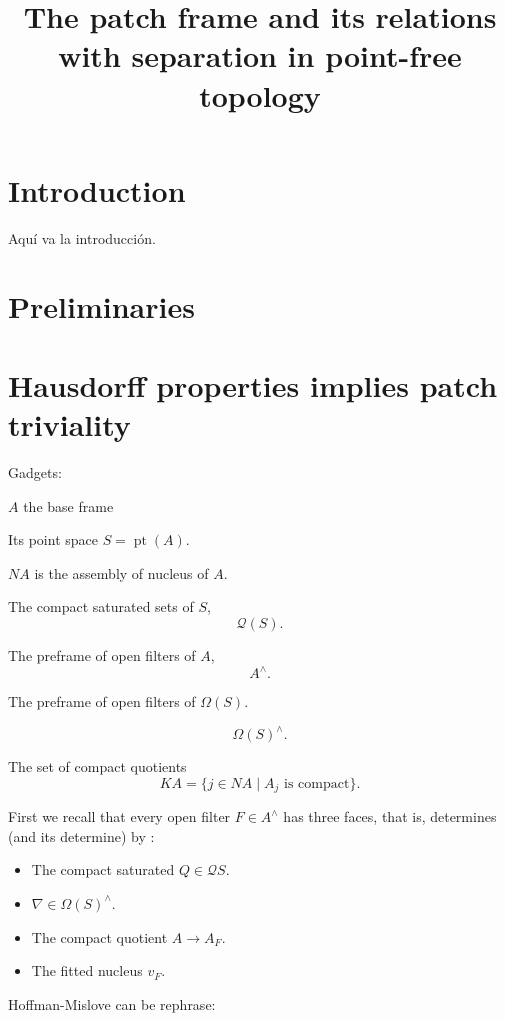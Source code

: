 \documentclass[11pt]{amsart}
\DeclareMathOperator{\pt}{pt}
\theoremstyle{plain}
\theoremstyle{definition}
\begin{document}

\title{The patch frame and its relations with separation in point-free topology}


\author{}
\email{}
\address{}


\address{}

\begin{abstract}

\end{abstract}

\maketitle
\section{Introduction}
Aquí va la introducción.
\section{Preliminaries}\label{pre}





\section{Hausdorff properties implies patch triviality}
Gadgets:

$A$ the base frame

Its point space $S=\pt(A)$.

$NA$ is the assembly of nucleus of $A$.
 
The compact saturated sets of $S$, \[\mathcal{Q}(S).\]

The preframe of open filters of $A$,
\[A^{\wedge}.\]

The preframe of open filters of $\Omega(S)$.

\[\Omega(S)^{\wedge}.\]

The set of compact quotients
\[
KA=\{j\in NA\mid A_j \mbox{ is compact}\}.
\]

First we recall that every open filter $F\in A^{\wedge}$ has three faces, that is, determines (and its determine) by :

\begin{itemize}
\item The compact saturated $Q\in \mathcal{Q}S$.
\item $\nabla\in\Omega(S)^{\wedge}$.
\item The compact quotient $A\rightarrow A_{F}$.
\item The fitted nucleus $v_{F}$.
\end{itemize}
Hoffman-Mislove can be rephrase:
\end{document}
